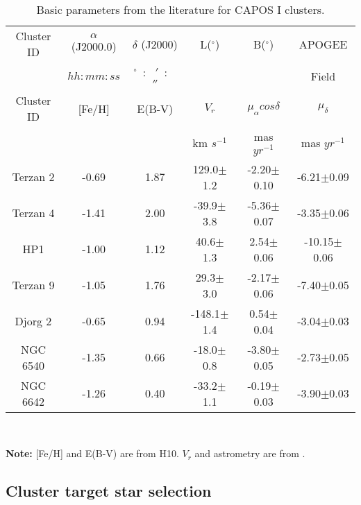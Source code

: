 \documentclass[onecolumn]{aa}
\begin{document}



\begin{table*}
	\begin{center}
		\setlength{\tabcolsep}{2.mm}  
		\caption{Basic parameters from the literature for CAPOS I clusters.}
		\begin{tabular}{ c c c c c c }
			\hline
			Cluster ID & $\alpha$ (J2000.0) & $\delta$ (J2000) & L($^\circ $) & B($^\circ $) & APOGEE  \\
			&   $hh:mm:ss$ & $^\circ $~:~ $ ' $~: ~ $''$  &  & & Field  \\
			\hline
\hline
Cluster ID & [Fe/H] & E(B-V) & $V_r$ & $\mu _{\alpha} cos\delta$ & $\mu _{\delta}$  \\
&    & & km $s^{-1}$  & mas $yr^{-1}$ & mas $yr^{-1}$ \\

\hline
Terzan 2 &   -0.69 & 1.87 & 129.0$\pm$1.2 & -2.20$\pm$0.10 &  -6.21$\pm$0.09\\
Terzan 4 &  -1.41 & 2.00 & -39.9$\pm$3.8  & -5.36$\pm$0.07 &  -3.35$\pm$0.06\\
HP1	&  -1.00  & 1.12 & 40.6$\pm$1.3 & 2.54$\pm$0.06 &  -10.15$\pm$0.06\\
Terzan 9 &   -1.05  & 1.76 & 29.3$\pm$3.0 & -2.17$\pm$0.06 &  -7.40$\pm$0.05\\
Djorg 2	&  -0.65 & 0.94 & -148.1$\pm$1.4 & 0.54$\pm$0.04 &  -3.04$\pm$0.03\\
NGC 6540	&   -1.35 & 0.66 & -18.0$\pm$0.8 & -3.80$\pm$0.05 &  -2.73$\pm$0.05\\
NGC 6642	&  -1.26 & 0.40 & -33.2$\pm$1.1 & -0.19$\pm$0.03 &  -3.90$\pm$0.03\\
			\hline
		\end{tabular}  \label{basicparams}\\
	\end{center}
	\raggedright{{\bf Note:} [Fe/H] and E(B-V) are from H10. $V_r$ and astrometry are from \citet{Baumgardt2019}. }
\end{table*}

\subsection{Cluster target star selection}
\end{document}
